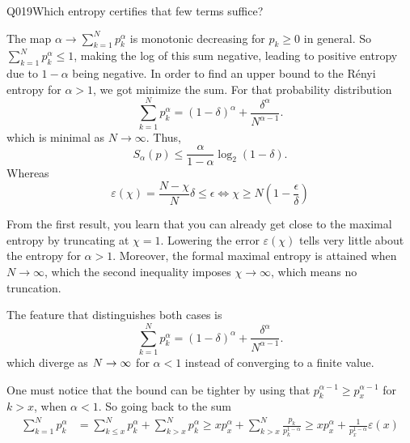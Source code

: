 \begin{entry}{Q019}{Which entropy certifies that few terms suffice?}
\begin{solution}[b]
The map $\alpha \rightarrow \sum_{k=1}^{N} p_k^{\alpha}$ is monotonic decreasing for $p_k\geq0$ in general. So $\sum_{k=1}^{N} p_k^{\alpha} \leq 1$, making the log of this sum negative, leading to positive entropy due to $1-\alpha$ being negative. In order to find an upper bound to the Rényi entropy for $\alpha>1$, we got minimize the sum.
For that probability distribution 
\begin{equation}
    \sum_{k=1}^{N} p_k^{\alpha} = (1-\delta)^\alpha + \frac{\delta^\alpha}{N^{\alpha-1}}.
\end{equation}
which is minimal as $N\rightarrow \infty$.
Thus,
\begin{equation}
    S_\alpha(p) \leq \frac{\alpha}{1-\alpha} \log_2 (1-\delta). 
\end{equation}
Whereas
\begin{equation}
    \varepsilon(\chi) = \frac{N-\chi}{N} \delta \leq \epsilon \iff \chi \geq N\left(1-\frac{\epsilon}{\delta}\right)
\end{equation}

From the first result, you learn that you can already get close to the maximal entropy by truncating at $\chi =1$. Lowering the error $\varepsilon(\chi)$ tells very little about the entropy for $\alpha>1$. Moreover, the formal maximal entropy is attained when $N\rightarrow \infty$, which the second inequality imposes $\chi \rightarrow \infty$, which means no truncation.

The feature that distinguishes both cases is 
\begin{equation}
    \sum_{k=1}^{N} p_k^{\alpha} = (1-\delta)^\alpha + \frac{\delta^\alpha}{N^{\alpha-1}}.
\end{equation}
which diverge as $N\rightarrow \infty$ for $\alpha <1$ instead of converging to a finite value.

\end{solution}


\begin{solution}
One must notice that the bound can be tighter by using that $p_k^{\alpha-1} \geq p_x^{\alpha-1}$ for $k>x$, when $\alpha<1$. So going back to the sum
\begin{equation}
\begin{split}
    \sum_{k=1}^{N} p_k^{\alpha} &= \sum_{k \leq x}^{N} p_k^{\alpha} + \sum_{k >x}^{N} p_k^{\alpha} \geq xp_x^\alpha + \sum_{k >x}^{N} \frac{p_k}{p_k^{1-\alpha}} \geq xp_x^\alpha + \frac{1}{p_x^{1-\alpha}} \varepsilon(x)
\end{split} 
\end{equation}


\end{solution}
\end{entry}
